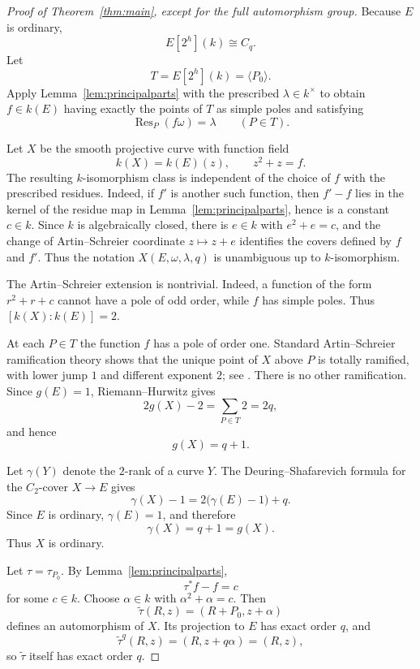\documentclass[11pt]{article}
\theoremstyle{remark}
\newcommand{\Res}{\operatorname{Res}}
\begin{document}
\begin{proof}[Proof of Theorem~\ref{thm:main}, except for the full automorphism group]
Because $E$ is ordinary,
\[
 E[2^h](k)\cong C_q.
\]
Let
\[
 T=E[2^h](k)=\langle P_0\rangle.
\]
Apply Lemma~\ref{lem:principalparts} with the prescribed
$\lambda\in k^\times$ to obtain $f\in k(E)$ having exactly the points of
$T$ as simple poles and satisfying
\[
 \Res_P(f\omega)=\lambda\qquad(P\in T).
\]

Let $X$ be the smooth projective curve with function field
\begin{equation}\label{eq:AS}
 k(X)=k(E)(z),\qquad z^2+z=f.
\end{equation}
The resulting $k$-isomorphism class is independent of the choice of $f$
with the prescribed residues.  Indeed, if $f'$ is another such function,
then $f'-f$ lies in the kernel of the residue map in
Lemma~\ref{lem:principalparts}, hence is a constant $c\in k$.  Since $k$ is
algebraically closed, there is $e\in k$ with $e^2+e=c$, and the change of
Artin--Schreier coordinate $z\mapsto z+e$ identifies the covers defined by
$f$ and $f'$.  Thus the notation $X(E,\omega,\lambda,q)$ is unambiguous
up to $k$-isomorphism.

The Artin--Schreier extension is nontrivial.  Indeed, a function of the
form $r^2+r+c$ cannot have a pole of odd order, while $f$ has simple
poles.  Thus $[k(X):k(E)]=2$.

At each $P\in T$ the function $f$ has a pole of order one.  Standard
Artin--Schreier ramification theory shows that the unique point of $X$
above $P$ is totally ramified, with lower jump $1$ and different exponent
$2$; see \cite[Proposition~III.7.8]{Stichtenoth}.  There is no other
ramification.  Since $g(E)=1$, Riemann--Hurwitz gives
\[
 2g(X)-2=\sum_{P\in T}2=2q,
\]
and hence
\begin{equation}\label{eq:genus}
 g(X)=q+1.
\end{equation}

Let $\gamma(Y)$ denote the $2$-rank of a curve $Y$.  The
Deuring--Shafarevich formula for the $C_2$-cover $X\to E$ gives
\[
 \gamma(X)-1
 =2\bigl(\gamma(E)-1\bigr)+q.
\]
Since $E$ is ordinary, $\gamma(E)=1$, and therefore
\[
 \gamma(X)=q+1=g(X).
\]
Thus $X$ is ordinary.

Let $\tau=\tau_{P_0}$.  By Lemma~\ref{lem:principalparts},
\[
 \tau^*f-f=c
\]
for some $c\in k$.  Choose $\alpha\in k$ with $\alpha^2+\alpha=c$.  Then
\[
 \widetilde\tau(R,z)=(R+P_0,z+\alpha)
\]
defines an automorphism of $X$.  Its projection to $E$ has exact order
$q$, and
\[
 \widetilde\tau^q(R,z)=(R,z+q\alpha)=(R,z),
\]
so $\widetilde\tau$ itself has exact order $q$.


\end{proof}
\end{document}
